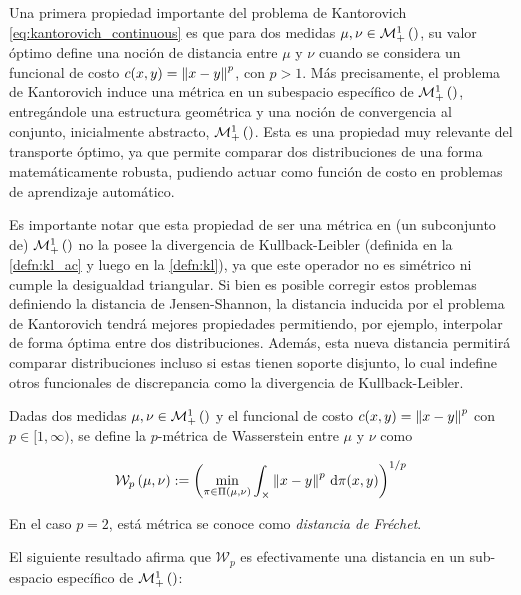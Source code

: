 Una primera propiedad importante del problema de Kantorovich \eqref{eq:kantorovich_continuous} es que para dos medidas $\mu,\nu\in\mathcal{M}_+^1\left(\right)$, su valor óptimo define una noción de distancia entre $\mu$ y $\nu$ cuando se considera un funcional de costo $c(x,y)=\left\lVert x-y \right\rVert^p$, con $p>1$. Más precisamente, el problema de Kantorovich induce una métrica en un subespacio específico de $\mathcal{M}_+^1\left(\right)$, entregándole una estructura geométrica y una noción de convergencia al conjunto, inicialmente abstracto, $\mathcal{M}_+^1\left(\right)$. Esta es una propiedad muy relevante del transporte óptimo, ya que permite comparar dos distribuciones de una forma matemáticamente robusta, pudiendo actuar como función de costo en problemas de aprendizaje automático.

Es importante notar que esta propiedad de ser una métrica en (un subconjunto de) $\mathcal{M}_+^1\left(\right)$ no la posee la divergencia de Kullback-Leibler (definida en la \autoref{defn:kl_ac} y luego en la \autoref{defn:kl}), ya que este operador no es simétrico ni cumple la desigualdad triangular. Si bien es posible corregir estos problemas definiendo la distancia de Jensen-Shannon, la distancia inducida por el problema de Kantorovich tendrá mejores propiedades permitiendo, por ejemplo, interpolar de forma óptima entre dos distribuciones. Además, esta nueva distancia permitirá comparar distribuciones incluso si estas tienen soporte disjunto, lo cual indefine otros funcionales de discrepancia como la divergencia de Kullback-Leibler.

\begin{defn}
	Dadas dos medidas $\mu,\nu\in\mathcal{M}_+^1\left(\right)$ y el funcional de costo $c(x,y)=\left\lVert x-y \right\rVert^p$ con $p\in[1,\infty)$, se define la $p$-métrica de Wasserstein entre $\mu$ y $\nu$ como

	\begin{equation*}
		\mathcal{W}_{p}\left(\mu, \nu\right) := \left(\min_{\pi \in \Pi(\mu, \nu)} \int_{\times} \left\lVert x-y \right\rVert^p \,\operatorname{d}\!\pi(x, y) \right)^{1/p}
	\end{equation*}

	En el caso $p=2$, está métrica se conoce como \textit{distancia de Fréchet}.

\end{defn}

El siguiente resultado afirma que $\mathcal{W}_p$ es efectivamente una distancia en un sub-espacio específico de $\mathcal{M}_+^1\left(\right)$:

